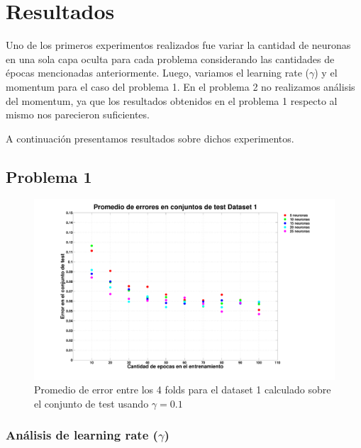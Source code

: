 \documentclass[informe.tex]{subfiles}
\begin{document}
  
  \section{Resultados}
  
    Uno de los primeros experimentos realizados fue variar la cantidad de neuronas en una sola capa oculta para cada problema considerando las cantidades de épocas mencionadas anteriormente. Luego, variamos el learning rate ($\gamma$) y el momentum para el caso del problema 1. En el problema 2 no realizamos an\'alisis del momentum, ya que los resultados obtenidos en el problema 1 respecto al mismo nos parecieron suficientes.
    
    A continuación presentamos resultados sobre dichos experimentos.
    
    \subsection{Problema 1}
 
      \begin{figure}[H]
	\begin{center}
	    \hspace*{-2cm}
	    \includegraphics[width=20cm]{graficos/d1_01.pdf}
	    \caption{Promedio de error entre los 4 folds para el dataset 1 calculado sobre el conjunto de test usando $\gamma=0.1$}
	    \label{fig:errorTest-d1}
	\end{center}
      \end{figure}
      
      \newpage
      \subsubsection{An\'alisis de learning rate ($\gamma$)}
    
\end{document}
